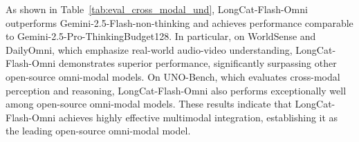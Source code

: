 \documentclass{article}
\begin{document}
As shown in Table~\ref{tab:eval_cross_modal_und}, LongCat-Flash-Omni outperforms Gemini-2.5-Flash-non-thinking and achieves performance comparable to Gemini-2.5-Pro-ThinkingBudget128. In particular, on WorldSense and DailyOmni, which emphasize real-world audio-video understanding, LongCat-Flash-Omni demonstrates superior performance, significantly surpassing other open-source omni-modal models. 
On UNO-Bench, which evaluates cross-modal perception and reasoning, LongCat-Flash-Omni also performs exceptionally well among open-source omni-modal models.
These results indicate that LongCat-Flash-Omni achieves highly effective multimodal integration, establishing it as the leading open-source omni-modal model.
\end{document}
